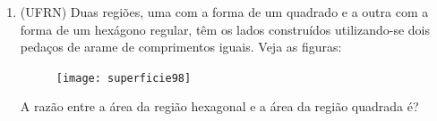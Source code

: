 \begin{enumerate}
  \item (UFRN) Duas regiões, uma com a forma de um quadrado e a outra com a forma de um hexágono regular, têm os lados construídos utilizando-se dois pedaços de arame de comprimentos iguais. Veja as figuras:

  \begin{figure}[H]
  \centering

  \texttt{[image: superficie98]}
  \end{figure}

  A razão entre a área da região hexagonal e a área da região quadrada é?
\end{enumerate}